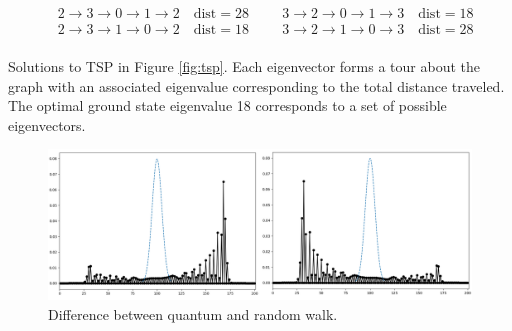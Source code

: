 \begin{table}[h]
\[\begin{split}
			&2 \rightarrow 3 \rightarrow 0 \rightarrow 1 \rightarrow 2 \quad \text{dist}=28 \hspace{1cm} 3 \rightarrow 2 \rightarrow 0 \rightarrow 1 \rightarrow 3 \quad \text{dist}=18\\
			&2 \rightarrow 3 \rightarrow 1 \rightarrow 0 \rightarrow 2 \quad \text{dist}=18 \hspace{1cm} 3 \rightarrow 2 \rightarrow 1 \rightarrow 0 \rightarrow 3 \quad \text{dist}=28\\
		\end{split}
		\]
		\caption{Solutions to TSP in Figure \ref{fig:tsp}. Each eigenvector forms a tour about the graph with an associated eigenvalue corresponding to the total distance traveled. The optimal ground state eigenvalue 18 corresponds to a set of possible eigenvectors.}
		\label{tab:eigenset}
	\end{table}
	\begin{center}
		\begin{figure}[h]
			\begin{center}
				\includegraphics[width=16cm]{images/bias}
			\end{center}
			\label{fig:biasWalk}\caption{Difference between quantum and random walk. }
		\end{figure}
	\end{center}
